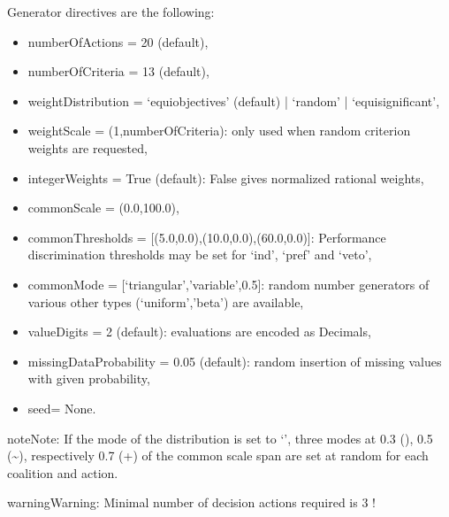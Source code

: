 \documentclass[a4paper,12pt,english]{sphinxhowto}
\begin{document}
Generator directives are the following:
\begin{itemize}
\item {} 
numberOfActions = 20 (default),

\item {} 
numberOfCriteria = 13 (default),

\item {} 
weightDistribution = ‘equiobjectives’ (default) | ‘random’ | ‘equisignificant’,

\item {} 
weightScale = (1,numberOfCriteria): only used when random criterion weights are requested,

\item {} 
integerWeights = True (default): False gives normalized rational weights,

\item {} 
commonScale = (0.0,100.0),

\item {} 
commonThresholds = {[}(5.0,0.0),(10.0,0.0),(60.0,0.0){]}: Performance discrimination thresholds may be set for ‘ind’, ‘pref’ and ‘veto’,

\item {} 
commonMode = {[}‘triangular’,’variable’,0.5{]}: random number generators of various other types (‘uniform’,’beta’) are available,

\item {} 
valueDigits = 2 (default): evaluations are encoded as Decimals,

\item {} 
missingDataProbability = 0.05 (default): random insertion of missing values with given probability,

\item {} 
seed= None.

\end{itemize}

\begin{sphinxadmonition}{note}{Note:}
If the mode of the  distribution is set to ‘’,
three modes at 0.3 (\sphinxhyphen{}), 0.5 (\textasciitilde{}), respectively 0.7 (+) of the common scale span are set at random for each coalition and action.
\end{sphinxadmonition}

\begin{sphinxadmonition}{warning}{Warning:}
Minimal number of decision actions required is 3 !
\end{sphinxadmonition}
\end{document}
